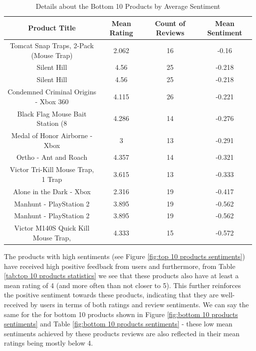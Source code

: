 \begin{table}[h]
  \centering
  \begin{tabular}{cccc}
      \hline
      \textbf{Product Title} & \textbf{Mean Rating} & \textbf{Count of Reviews} & \textbf{Mean Sentiment} \\
      \hline
      Tomcat Snap Traps, 2-Pack (Mouse Trap) &         2.062 &      16 &       -0.16  \\
      Silent Hill                            &         4.56  &      25 &       -0.218 \\
      Silent Hill                            &         4.56  &      25 &       -0.218 \\
      Condemned Criminal Origins - Xbox 360  &         4.115 &      26 &       -0.221 \\
      Black Flag Mouse Bait Station (8       &         4.286 &      14 &       -0.276 \\
      Medal of Honor Airborne - Xbox         &         3     &      13 &       -0.291 \\
      Ortho - Ant and Roach                  &         4.357 &      14 &       -0.321 \\
      Victor Tri-Kill Mouse Trap, 1 Trap     &         3.615 &      13 &       -0.333 \\
      Alone in the Dark - Xbox               &         2.316 &      19 &       -0.417 \\
      Manhunt - PlayStation 2                &         3.895 &      19 &       -0.562 \\
      Manhunt - PlayStation 2                &         3.895 &      19 &       -0.562 \\
      Victor M140S Quick Kill Mouse Trap,    &         4.333 &      15 &       -0.572 \\
           \hline
  \end{tabular}
  \caption{Details about the Bottom 10 Products by Average Sentiment}
  \label{tab:bottom 10 products statistics}
\end{table}

The products with high sentiments (see Figure \ref{fig:top 10 products sentiments}) have received high positive feedback from users and furthermore, from Table \ref{tab:top 10 products statistics} we see that these products also have at least a mean rating of 4 (and more often than not closer to 5). This further reinforces the positive sentiment towards these products, indicating that they are well-received by users in terms of both ratings and review sentiments. We can say the same for the for bottom 10 products shown in Figure \ref{fig:bottom 10 products sentiments}  and Table \ref{fig:bottom 10 products sentiments} - these low mean sentiments achieved by these products reviews are also reflected in their mean ratings being mostly below 4.

